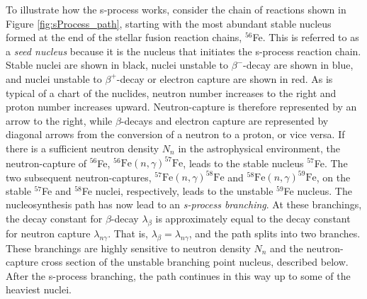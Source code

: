 


To illustrate how the s-process works, consider the chain of reactions shown in Figure \ref{fig:sProcess_path}, starting with the most abundant stable nucleus formed at the end of the stellar fusion reaction chains, $^{56}$Fe. This is referred to as a \emph{seed nucleus} because it is the nucleus that initiates the s-process reaction chain. Stable nuclei are shown in black, nuclei unstable to $\beta^{-}$-decay are shown in blue, and nuclei unstable to $\beta^{+}$-decay or electron capture are shown in red. As is typical of a chart of the nuclides, neutron number increases to the right and proton number increases upward. Neutron-capture is therefore represented by an arrow to the right, while $\beta$-decays and electron capture are represented by diagonal arrows from the conversion of a neutron to a proton, or vice versa. If there is a sufficient neutron density $N_{n}$ in the astrophysical environment, the neutron-capture of $^{56}$Fe, $^{56}\mathrm{Fe}(n,\gamma)^{57}\mathrm{Fe}$, leads to the stable nucleus $^{57}$Fe. The two subsequent neutron-captures,  $^{57}\mathrm{Fe}(n,\gamma)^{58}\mathrm{Fe}$ and  $^{58}\mathrm{Fe}(n,\gamma)^{59}\mathrm{Fe}$, on the stable $^{57}$Fe and $^{58}$Fe nuclei, respectively, leads to the unstable $^{59}$Fe nucleus. The nucleosynthesis path has now lead to an \emph{s-process branching}. At these branchings, the decay constant for $\beta$-decay $\lambda_{\beta}$ is approximately equal to the decay constant for neutron capture $\lambda_{n\gamma}$. That is, $\lambda_{\beta} = \lambda_{n\gamma}$, and the path splits into two branches. These branchings are highly sensitive to neutron density $N_{n}$ and the neutron-capture cross section of the unstable branching point nucleus, described below. After the s-process branching, the path continues in this way up to some of the heaviest nuclei.

